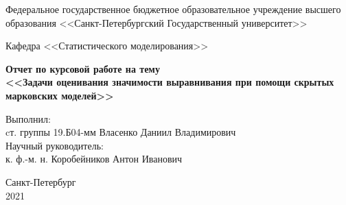 \documentclass[]{article}
\begin{document}
	\begin{titlepage}
		\begin{center}
			{\large Федеральное государственное бюджетное образовательное учреждение высшего образования
			<<Санкт-Петербургский Государственный университет>>}
			\vspace{1em}
			
			{\large Кафедра <<Статистического моделирования>>}
			\vspace{15em}
			
			{\bfseries{\Large Отчет по курсовой работе на тему\\ <<Задачи оценивания значимости выравнивания при помощи скрытых марковских моделей>>}}
		\end{center}
		\vspace{8em}
		\begin{flushleft}
			Выполнил:\\
			cт. группы 19.Б04-мм Власенко Даниил Владимирович\\
			Научный руководитель:\\
			к. ф.-м. н. Коробейников Антон Иванович
		\end{flushleft}
		\vspace{16em}
		\begin{center}
			Санкт-Петербург\\
			2021
		\end{center}
	\end{titlepage}

	
\end{document}
